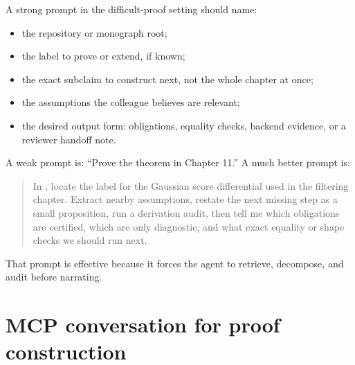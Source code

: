 \documentclass[12pt,a4paper,openany]{book}
\begin{document}
A strong prompt in the difficult-proof setting should name:

\begin{itemize}
  \item the repository or monograph root;
  \item the label to prove or extend, if known;
  \item the exact subclaim to construct next, not the whole chapter at once;
  \item the assumptions the colleague believes are relevant;
  \item the desired output form: obligations, equality checks, backend evidence,
        or a reviewer handoff note.
\end{itemize}

A weak prompt is: ``Prove the theorem in Chapter 11.''
A much better prompt is:

\begin{quote}
In , locate the label for the Gaussian
score differential used in the filtering chapter. Extract nearby assumptions,
restate the next missing step as a small proposition, run a derivation audit,
then tell me which obligations are certified, which are only diagnostic, and
what exact equality or shape checks we should run next.
\end{quote}

That prompt is effective because it forces the agent to retrieve, decompose, and
audit before narrating.

\section*{MCP conversation for proof construction}
\end{document}
